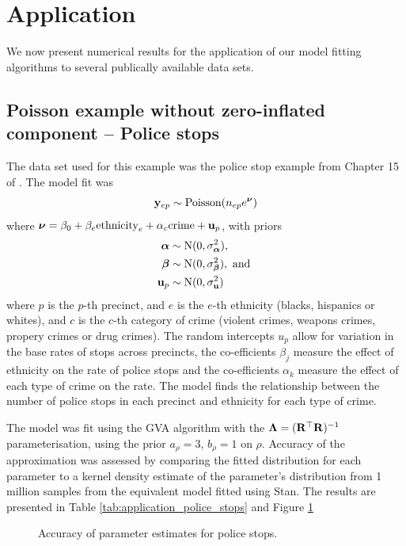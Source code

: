 \section{Application}
We now present numerical results for the application of our model fitting
algorithms to several publically available data sets.

\label{sec:application}

\subsection{Poisson example without zero-inflated component -- Police stops}
\label{sec:police_stops}
The data set used for this example was the police stop example from Chapter 15 of \cite{Gelman2007}.
The model fit was
$$
	{\bf y}_{ep}        \sim \text{Poisson}(n_{ep} e^{\boldsymbol \nu})
$$
where ${\boldsymbol \nu} = {\beta_0 + \beta_e \text{ethnicity}_e + \alpha_{c} \text{crime} + {\bf u}_p}$, with priors
\begin{align*}
	{\boldsymbol\alpha}				& \sim \text{N}(0, \sigma_{\boldsymbol \alpha}^2),	\\
	{\boldsymbol \beta}        & \sim \text{N}(0, \sigma_{\boldsymbol \beta}^2), \text{ and }\\
	{\bf u}_p         & \sim \text{N}(0, \sigma_{\bf u}^2)
\end{align*}
where $p$ is the $p$-th precinct, and $e$ is the $e$-th ethnicity (blacks,
hispanics or whites), and $c$ is the $c$-th category of crime (violent crimes,
weapons crimes, propery crimes or drug crimes). The random intercepts $u_p$
allow for variation in the base rates of stops across precincts, the
co-efficients $\beta_j$ measure the effect of ethnicity on the rate of police
stops and the co-efficients $\alpha_k$ measure the effect of each type of crime
on the rate. The model finds the relationship between the number of police
stops in each precinct and  ethnicity for each type of crime.

The model was fit using the GVA algorithm with the ${\boldsymbol \Lambda} = ({\bf R}^\top
{\bf R})^{-1}$ parameterisation, using the prior $a_\rho = 3$, $b_\rho = 1$ on
$\rho$. Accuracy of the approximation was assessed by comparing the fitted
distribution for each parameter to a kernel density estimate of the parameter's
distribution from 1 million samples from the equivalent model fitted using
Stan. The results are presented in Table \ref{tab:application_police_stops} and
Figure \ref{fig:police_stops}

\begin{figure}
\centering
{}
\caption{Accuracy of parameter estimates for police stops.}
\label{fig:police_stops}
\end{figure}

